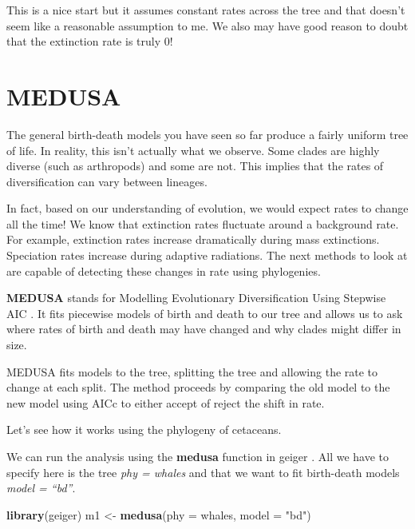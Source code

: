\documentclass[
]{book}
\newenvironment{Shaded}{\begin{snugshade}}{\end{snugshade}}
\newcommand{\DataTypeTok}[1]{\textcolor[rgb]{0.13,0.29,0.53}{#1}}
\newcommand{\KeywordTok}[1]{\textcolor[rgb]{0.13,0.29,0.53}{\textbf{#1}}}
\newcommand{\NormalTok}[1]{#1}
\newcommand{\StringTok}[1]{\textcolor[rgb]{0.31,0.60,0.02}{#1}}
\begin{document}
This is a nice start but it assumes constant rates across the tree and that doesn't seem like a reasonable assumption to me. We also may have good reason to doubt that the extinction rate is truly 0!

\hypertarget{medusa}{%
\section{MEDUSA}\label{medusa}}

The general birth-death models you have seen so far produce a fairly uniform tree of life. In reality, this isn't actually what we observe. Some clades are highly diverse (such as arthropods) and some are not. This implies that the rates of diversification can vary between lineages.

In fact, based on our understanding of evolution, we would expect rates to change all the time! We know that extinction rates fluctuate around a background rate. For example, extinction rates increase dramatically during mass extinctions. Speciation rates increase during adaptive radiations. The next methods to look at are capable of detecting these changes in rate using phylogenies.

\textbf{MEDUSA} stands for Modelling Evolutionary Diversification Using Stepwise AIC \citep{Alfaro09}. It fits piecewise models of birth and death to our tree and allows us to ask where rates of birth and death may have changed and why clades might differ in size.

MEDUSA fits models to the tree, splitting the tree and allowing the rate to change at each split. The method proceeds by comparing the old model to the new model using AICc to either accept of reject the shift in rate.

Let's see how it works using the phylogeny of cetaceans.

We can run the analysis using the \textbf{medusa} function in geiger \citep{geiger}. All we have to specify here is the tree \emph{phy = whales} and that we want to fit birth-death models \emph{model = ``bd''}.

\begin{Shaded}
\begin{Highlighting}[]
\KeywordTok{library}\NormalTok{(geiger)}
\NormalTok{m1 \textless{}{-}}\StringTok{ }\KeywordTok{medusa}\NormalTok{(}\DataTypeTok{phy =}\NormalTok{ whales, }\DataTypeTok{model =} \StringTok{"bd"}\NormalTok{)}
\end{Highlighting}
\end{Shaded}
\end{document}
